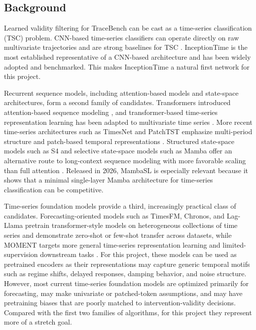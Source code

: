 \documentclass[11pt]{article}
\begin{document}
\subsection*{Background}
Learned validity filtering for TraceBench can be cast as a time-series classification (TSC) problem.
CNN-based time-series classifiers can operate directly on raw multivariate trajectories and are strong baselines for TSC \cite{ismailfawaz2019dlreview,wang2017timeseries}. 
InceptionTime is the most established representative of a CNN-based architecture \cite{ismailfawaz2020inceptiontime} and has been widely adopted and benchmarked.
This makes InceptionTime a natural first network for this project.

Recurrent sequence models, including attention-based models and state-space architectures, form a second family of candidates.
Transformers introduced attention-based sequence modeling \cite{vaswani2017attention}, and transformer-based time-series representation learning has been adapted to multivariate time series \cite{zerveas2021transformer}. 
More recent time-series architectures such as TimesNet and PatchTST emphasize multi-period structure and patch-based temporal representations \cite{wu2023timesnet,nie2023patchtst}.
Structured state-space models such as S4 and selective state-space models such as Mamba offer an alternative route to long-context sequence modeling with more favorable scaling than full attention \cite{gu2022s4,gu2023mamba}. 
Released in 2026, MambaSL \cite{jung2026mambasl} is especially relevant because it shows that a minimal single-layer Mamba architecture for time-series classification can be competitive.

Time-series foundation models provide a third, increasingly practical class of candidates.
Forecasting-oriented models such as TimesFM, Chronos, and Lag-Llama pretrain transformer-style models on heterogeneous collections of time series and demonstrate zero-shot or few-shot transfer across datasets, while MOMENT targets more general time-series representation learning and limited-supervision downstream tasks \cite{das2023timesfm,ansari2024chronos,rasul2023lagllama,goswami2024moment}.
For this project, these models can be used as pretrained encoders as their representations may capture generic temporal motifs such as regime shifts, delayed responses, damping behavior, and noise structure.
However, most current time-series foundation models are optimized primarily for forecasting, may make univariate or patched-token assumptions, and may have pretraining biases that are poorly matched to intervention-validity decisions.
Compared with the first two families of algorithms, for this project they represent more of a stretch goal.
\end{document}
